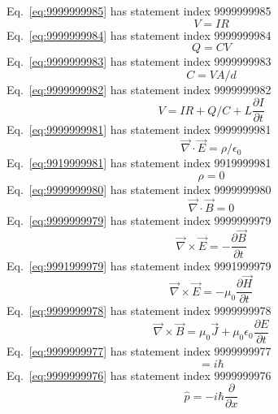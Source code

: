 \documentclass[12pt]{report}
\begin{document}
Eq.~\ref{eq:9999999985} has statement index 9999999985
\begin{equation}
V=I R
\label{eq:9999999985}
\end{equation}
Eq.~\ref{eq:9999999984} has statement index 9999999984
\begin{equation}
Q=C V
\label{eq:9999999984}
\end{equation}
Eq.~\ref{eq:9999999983} has statement index 9999999983
\begin{equation}
C = V A/d
\label{eq:9999999983}
\end{equation}
Eq.~\ref{eq:9999999982} has statement index 9999999982
\begin{equation}
V=I R + Q/C + L \frac{\partial I}{\partial t}
\label{eq:9999999982}
\end{equation}
Eq.~\ref{eq:9999999981} has statement index 9999999981
\begin{equation}
\vec{\nabla} \cdot \vec{E} = \rho/\epsilon_0
\label{eq:9999999981}
\end{equation}
Eq.~\ref{eq:9919999981} has statement index 9919999981
\begin{equation}
\rho=0
\label{eq:9919999981}
\end{equation}
Eq.~\ref{eq:9999999980} has statement index 9999999980
\begin{equation}
\vec{\nabla} \cdot \vec{B} = 0
\label{eq:9999999980}
\end{equation}
Eq.~\ref{eq:9999999979} has statement index 9999999979
\begin{equation}
\vec{\nabla} \times \vec{E} = -\frac{\partial \vec{B}}{\partial t}
\label{eq:9999999979}
\end{equation}
Eq.~\ref{eq:9991999979} has statement index 9991999979
\begin{equation}
\vec{\nabla} \times \vec{E} = -\mu_0\frac{\partial \vec{H}}{\partial t}
\label{eq:9991999979}
\end{equation}
Eq.~\ref{eq:9999999978} has statement index 9999999978
\begin{equation}
\vec{\nabla} \times \vec{B} = \mu_0 \vec{J} + \mu_0 \epsilon_0 \frac{\partial E}{\partial t}
\label{eq:9999999978}
\end{equation}
Eq.~\ref{eq:9999999977} has statement index 9999999977
\begin{equation}
[\hat{x},\hat{p}] = i \hbar
\label{eq:9999999977}
\end{equation}
Eq.~\ref{eq:9999999976} has statement index 9999999976
\begin{equation}
\hat{p} = -i \hbar \frac{\partial }{\partial x}
\label{eq:9999999976}
\end{equation}
\end{document}

